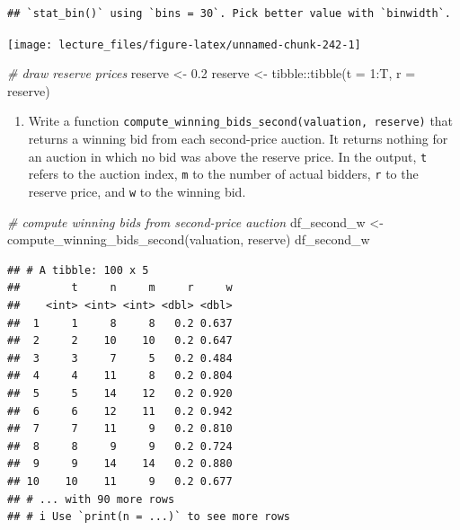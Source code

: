 \documentclass[
]{book}
\newenvironment{Shaded}{\begin{snugshade}}{\end{snugshade}}
\newcommand{\AttributeTok}[1]{\textcolor[rgb]{0.77,0.63,0.00}{#1}}
\newcommand{\CommentTok}[1]{\textcolor[rgb]{0.56,0.35,0.01}{\textit{#1}}}
\newcommand{\DecValTok}[1]{\textcolor[rgb]{0.00,0.00,0.81}{#1}}
\newcommand{\FloatTok}[1]{\textcolor[rgb]{0.00,0.00,0.81}{#1}}
\newcommand{\FunctionTok}[1]{\textcolor[rgb]{0.00,0.00,0.00}{#1}}
\newcommand{\NormalTok}[1]{#1}
\newcommand{\OtherTok}[1]{\textcolor[rgb]{0.56,0.35,0.01}{#1}}
\newcommand{\SpecialCharTok}[1]{\textcolor[rgb]{0.00,0.00,0.00}{#1}}
\providecommand{\tightlist}{%
  \setlength{\itemsep}{0pt}\setlength{\parskip}{0pt}}
\begin{document}
\begin{verbatim}
## `stat_bin()` using `bins = 30`. Pick better value with `binwidth`.
\end{verbatim}

\begin{center}\texttt{[image: lecture\_files/figure-latex/unnamed-chunk-242-1]} \end{center}

\begin{Shaded}
\begin{Highlighting}[]
\CommentTok{\# draw reserve prices}
\NormalTok{reserve }\OtherTok{\textless{}{-}} \FloatTok{0.2}
\NormalTok{reserve }\OtherTok{\textless{}{-}}\NormalTok{ tibble}\SpecialCharTok{::}\FunctionTok{tibble}\NormalTok{(}\AttributeTok{t =} \DecValTok{1}\SpecialCharTok{:}\NormalTok{T, }\AttributeTok{r =}\NormalTok{ reserve)}
\end{Highlighting}
\end{Shaded}

\begin{enumerate}
\def\labelenumi{\arabic{enumi}.}
\setcounter{enumi}{2}
\tightlist
\item
  Write a function \texttt{compute\_winning\_bids\_second(valuation,\ reserve)} that returns a winning bid from each second-price auction. It returns nothing for an auction in which no bid was above the reserve price. In the output, \texttt{t} refers to the auction index, \texttt{m} to the number of actual bidders, \texttt{r} to the reserve price, and \texttt{w} to the winning bid.
\end{enumerate}

\begin{Shaded}
\begin{Highlighting}[]
\CommentTok{\# compute winning bids from second{-}price auction}
\NormalTok{df\_second\_w }\OtherTok{\textless{}{-}}
  \FunctionTok{compute\_winning\_bids\_second}\NormalTok{(valuation, reserve)}
\NormalTok{df\_second\_w}
\end{Highlighting}
\end{Shaded}

\begin{verbatim}
## # A tibble: 100 x 5
##        t     n     m     r     w
##    <int> <int> <int> <dbl> <dbl>
##  1     1     8     8   0.2 0.637
##  2     2    10    10   0.2 0.647
##  3     3     7     5   0.2 0.484
##  4     4    11     8   0.2 0.804
##  5     5    14    12   0.2 0.920
##  6     6    12    11   0.2 0.942
##  7     7    11     9   0.2 0.810
##  8     8     9     9   0.2 0.724
##  9     9    14    14   0.2 0.880
## 10    10    11     9   0.2 0.677
## # ... with 90 more rows
## # i Use `print(n = ...)` to see more rows
\end{verbatim}
\end{document}
